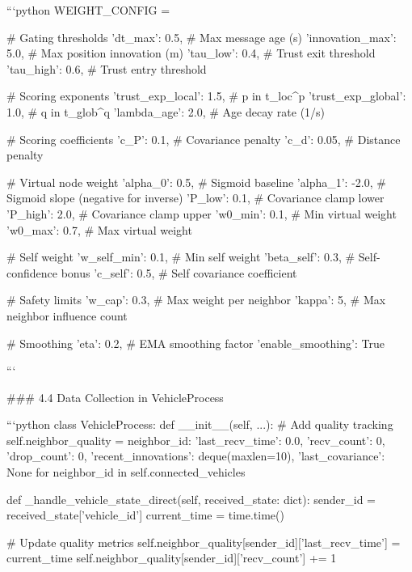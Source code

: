```python
WEIGHT_CONFIG = {
    # Gating thresholds
    'dt_max': 0.5,              # Max message age (s)
    'innovation_max': 5.0,      # Max position innovation (m)
    'tau_low': 0.4,             # Trust exit threshold
    'tau_high': 0.6,            # Trust entry threshold
    
    # Scoring exponents
    'trust_exp_local': 1.5,     # p in t_loc^p
    'trust_exp_global': 1.0,    # q in t_glob^q
    'lambda_age': 2.0,          # Age decay rate (1/s)
    
    # Scoring coefficients
    'c_P': 0.1,                 # Covariance penalty
    'c_d': 0.05,                # Distance penalty
    
    # Virtual node weight
    'alpha_0': 0.5,             # Sigmoid baseline
    'alpha_1': -2.0,            # Sigmoid slope (negative for inverse)
    'P_low': 0.1,               # Covariance clamp lower
    'P_high': 2.0,              # Covariance clamp upper
    'w0_min': 0.1,              # Min virtual weight
    'w0_max': 0.7,              # Max virtual weight
    
    # Self weight
    'w_self_min': 0.1,          # Min self weight
    'beta_self': 0.3,           # Self-confidence bonus
    'c_self': 0.5,              # Self covariance coefficient
    
    # Safety limits
    'w_cap': 0.3,               # Max weight per neighbor
    'kappa': 5,                 # Max neighbor influence count
    
    # Smoothing
    'eta': 0.2,                 # EMA smoothing factor
    'enable_smoothing': True
}
```

### 4.4 Data Collection in VehicleProcess

```python
class VehicleProcess:
    def __init__(self, ...):
        # Add quality tracking
        self.neighbor_quality = {
            neighbor_id: {
                'last_recv_time': 0.0,
                'recv_count': 0,
                'drop_count': 0,
                'recent_innovations': deque(maxlen=10),
                'last_covariance': None
            }
            for neighbor_id in self.connected_vehicles
        }
    
    def _handle_vehicle_state_direct(self, received_state: dict):
        sender_id = received_state['vehicle_id']
        current_time = time.time()
        
        # Update quality metrics
        self.neighbor_quality[sender_id]['last_recv_time'] = current_time
        self.neighbor_quality[sender_id]['recv_count'] += 1
        
